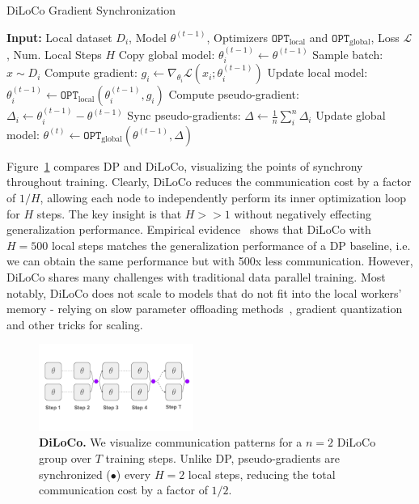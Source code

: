 \documentclass{article}
\newcommand{\purplecircle}{\textcolor{ppurple}{\LARGE$\bullet$}}
\begin{document}
\begin{algorithm}
\caption{DiLoCo Gradient Synchronization}
\label{alg:diloco}
\begin{algorithmic}[1]
\State \textbf{Input:} Local dataset $D_i$, Model $\theta^{(t-1)}$, Optimizers $\mathtt{OPT}_{\text{local}}$ and $\mathtt{OPT}_{\text{global}}$, Loss $\mathcal{L}$, Num. Local Steps $H$ 
\State Copy global model: $\theta_i^{(t-1)} \gets \theta^{(t-1)}$
  \State Sample batch: $x \sim D_i$
  \State Compute gradient: $g_i \gets \nabla_{\theta_i} \mathcal{L}(x_i; \theta_i^{(t-1)})$
  \State Update local model: $\theta_i^{(t-1)} \gets \mathtt{OPT}_{\text{local}}(\theta_i^{(t-1)}, g_i)$
\EndFor
\State Compute pseudo-gradient: $\Delta_i \gets \theta_i^{(t-1)} - \theta^{(t-1)}$
\State Sync pseudo-gradients: $\Delta \gets \frac{1}{n}\sum_i^n \Delta_i$ 
\State Update global model: $\theta^{(t)} \gets \mathtt{OPT}_{\text{global}}(\theta^{(t-1)}, \Delta)$
\end{algorithmic}
\end{algorithm}

Figure~\ref{fig:diloco} compares DP and DiLoCo, visualizing the points of
synchrony throughout training. Clearly, DiLoCo reduces the communication cost by
a factor of $1/H$, allowing each node to independently perform its inner
optimization loop for $H$ steps. The key insight is that $H>>1$ without
negatively effecting generalization performance. Empirical
evidence~\cite{douillard2023diloco,jaghouar2024opendiloco} shows that DiLoCo
with $H=500$ local steps matches the generalization performance of a DP
baseline, i.e. we can obtain the same performance but with 500x less
communication. However, DiLoCo shares many challenges with traditional data
parallel training. Most notably, DiLoCo does not scale to models that do not fit
into the local workers' memory - relying on slow parameter offloading
methods~\cite{cui2016}, gradient quantization~\cite{jaghouar2024intellect1} and
other tricks for scaling.

\begin{figure}[ht]
    \centering
    \vspace{0.5cm}
    \includegraphics[width=0.45\textwidth]{figures/diloco.pdf}
    \caption{\textbf{DiLoCo.} We visualize communication patterns for a $n=2$
    DiLoCo group over $T$ training steps. Unlike DP, pseudo-gradients are
    synchronized (\purplecircle) every $H=2$ local steps, reducing the total
    communication cost by a factor of $1/2$.}
    \label{fig:diloco}
\end{figure}
\end{document}
